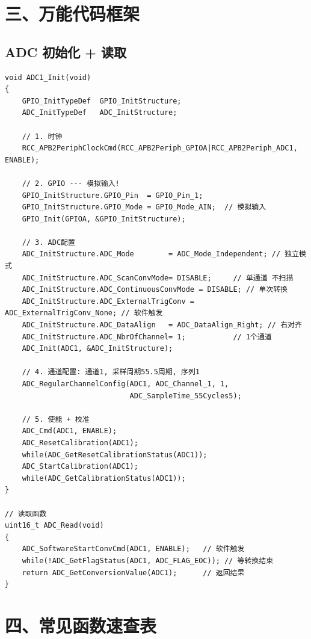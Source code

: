 \documentclass[10pt,a4paper,oneside]{ctexart}
\begin{document}
\section*{三、万能代码框架}

\subsection*{ADC 初始化 + 读取}

\begin{codebox}
\begin{lstlisting}[style=stm32, numbers=none]
void ADC1_Init(void)
{
    GPIO_InitTypeDef  GPIO_InitStructure;
    ADC_InitTypeDef   ADC_InitStructure;

    // 1. 时钟
    RCC_APB2PeriphClockCmd(RCC_APB2Periph_GPIOA|RCC_APB2Periph_ADC1, ENABLE);

    // 2. GPIO --- 模拟输入!
    GPIO_InitStructure.GPIO_Pin  = GPIO_Pin_1;
    GPIO_InitStructure.GPIO_Mode = GPIO_Mode_AIN;  // 模拟输入
    GPIO_Init(GPIOA, &GPIO_InitStructure);

    // 3. ADC配置
    ADC_InitStructure.ADC_Mode        = ADC_Mode_Independent; // 独立模式
    ADC_InitStructure.ADC_ScanConvMode= DISABLE;     // 单通道 不扫描
    ADC_InitStructure.ADC_ContinuousConvMode = DISABLE; // 单次转换
    ADC_InitStructure.ADC_ExternalTrigConv = ADC_ExternalTrigConv_None; // 软件触发
    ADC_InitStructure.ADC_DataAlign   = ADC_DataAlign_Right; // 右对齐
    ADC_InitStructure.ADC_NbrOfChannel= 1;           // 1个通道
    ADC_Init(ADC1, &ADC_InitStructure);

    // 4. 通道配置: 通道1, 采样周期55.5周期, 序列1
    ADC_RegularChannelConfig(ADC1, ADC_Channel_1, 1,
                             ADC_SampleTime_55Cycles5);

    // 5. 使能 + 校准
    ADC_Cmd(ADC1, ENABLE);
    ADC_ResetCalibration(ADC1);
    while(ADC_GetResetCalibrationStatus(ADC1));
    ADC_StartCalibration(ADC1);
    while(ADC_GetCalibrationStatus(ADC1));
}

// 读取函数
uint16_t ADC_Read(void)
{
    ADC_SoftwareStartConvCmd(ADC1, ENABLE);   // 软件触发
    while(!ADC_GetFlagStatus(ADC1, ADC_FLAG_EOC)); // 等转换结束
    return ADC_GetConversionValue(ADC1);      // 返回结果
}
\end{lstlisting}
\end{codebox}

\section*{四、常见函数速查表}
\end{document}

